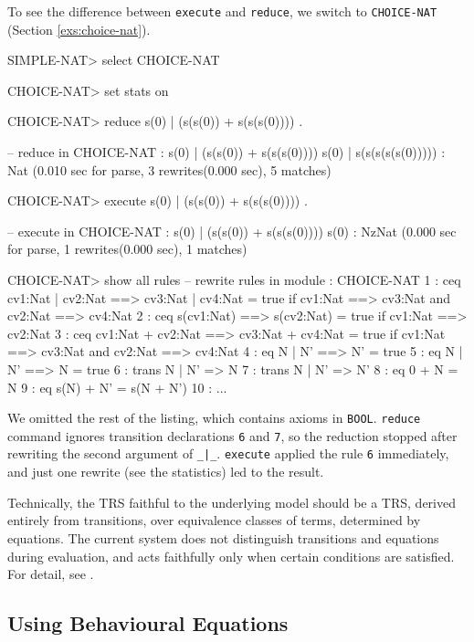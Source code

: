 \documentclass[a4paper]{memoir}
\begin{document}
To see the difference between \verb|execute| and \verb|reduce|,
we switch to \verb|CHOICE-NAT| (Section \ref{exs:choice-nat}).
\begin{vvtm}
\begin{ccode}
  SIMPLE-NAT> select CHOICE-NAT

  CHOICE-NAT> set stats on

  CHOICE-NAT> reduce s(0) | (s(s(0)) + s(s(s(0)))) .

  -- reduce in CHOICE-NAT : s(0) | (s(s(0)) + s(s(s(0))))
  s(0) | s(s(s(s(s(0))))) : Nat
  (0.010 sec for parse, 3 rewrites(0.000 sec), 5 matches)

  CHOICE-NAT> execute s(0) | (s(s(0)) + s(s(s(0)))) .

  -- execute in CHOICE-NAT : s(0) | (s(s(0)) + s(s(s(0))))
  s(0) : NzNat
  (0.000 sec for parse, 1 rewrites(0.000 sec), 1 matches)

  CHOICE-NAT> show all rules
   -- rewrite rules in module : CHOICE-NAT
    1 : ceq cv1:Nat | cv2:Nat ==> cv3:Nat | cv4:Nat = true if cv1:Nat ==> 
      cv3:Nat and cv2:Nat ==> cv4:Nat
    2 : ceq s(cv1:Nat) ==> s(cv2:Nat) = true if cv1:Nat ==> cv2:Nat
    3 : ceq cv1:Nat + cv2:Nat ==> cv3:Nat + cv4:Nat = true if cv1:Nat ==> 
      cv3:Nat and cv2:Nat ==> cv4:Nat
    4 : eq N | N' ==> N' = true
    5 : eq N | N' ==> N = true
    6 : trans N | N' => N
    7 : trans N | N' => N'
    8 : eq 0 + N = N
    9 : eq s(N) + N' = s(N + N')
   10 : ...
\end{ccode}
\end{vvtm}
We omitted the rest of the listing, which contains axioms in
\verb|BOOL|. \verb|reduce| command ignores transition declarations
\verb|6| and \verb|7|, so the reduction stopped after rewriting
the second argument of \verb+_|_+. \verb|execute| applied the
rule \verb|6| immediately, and just one rewrite (see the statistics)
led to the result.

\begin{warning}
  Technically, the TRS faithful to the underlying model
  should be a TRS, derived entirely from transitions, over equivalence
  classes of terms, determined by equations. The current system
  does not distinguish transitions and equations during evaluation,
  and acts faithfully only when certain conditions are satisfied.
  For detail, see \cite{rew-logic}.
\end{warning}

\subsection{Using Behavioural Equations}\label{sec:p2-eval-exs-3}
\end{document}
